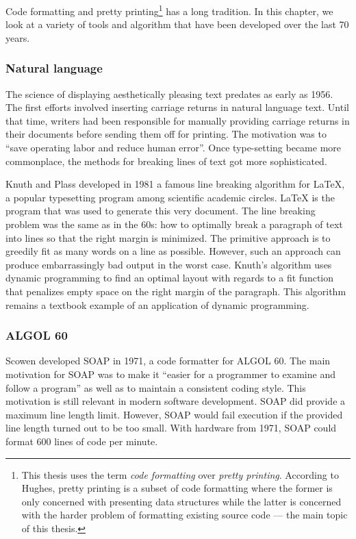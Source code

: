 Code formatting and pretty printing\footnote{
  This thesis uses the term \emph{code formatting} over \emph{pretty printing}.
  According to Hughes\autocite{hughes_design_1995}, pretty printing is a subset of code formatting where
  the former is only concerned with presenting data structures while the latter is
  concerned with the harder problem of formatting existing source code --- the main topic of this thesis.} has a long tradition.
In this chapter, we look at a variety of tools and algorithm that have been developed over the last 70 years.

\subsubsection{Natural language}
The science of displaying aesthetically pleasing text predates as early as 1956\autocite{harris_keyboard_1956}.
The first efforts involved inserting carriage returns in natural language text.
Until that time, writers had been responsible for manually providing carriage returns in their documents before sending them off for printing.
The motivation was to ``save operating labor and reduce human error''.
Once type-setting became more commonplace, the methods for breaking lines of text got more sophisticated.

Knuth and Plass developed in 1981 a famous line breaking algorithm\autocite{knuth_breaking_1981} for \LaTeX{}, a popular typesetting program among scientific academic circles.
\LaTeX{} is the program that was used to generate this very document.
The line breaking problem was the same as in the 60s: how to optimally break a paragraph of text into lines so that the right margin is minimized.
The primitive approach is to greedily fit as many words on a line as possible.
However, such an approach can produce embarrassingly bad output in the worst case.
Knuth's algorithm uses dynamic programming to find an optimal layout with regards to a fit function that penalizes empty space on the right margin of the paragraph.
This algorithm remains a textbook example of an application of dynamic programming\autocite{dreyfus2002richard,kleinberg2006algorithm}.

\subsubsection{ALGOL 60}
Scowen\autocite{scowen_soapprogram_1971} developed SOAP in 1971, a code formatter for ALGOL 60.
The main motivation for SOAP was to make it ``easier for a programmer to examine and follow a program'' as well as to maintain a consistent coding style.
This motivation is still relevant in modern software development.
SOAP did provide a maximum line length limit.
However, SOAP would fail execution if the provided line length turned out to be too small.
With hardware from 1971, SOAP could format 600 lines of code per minute.

